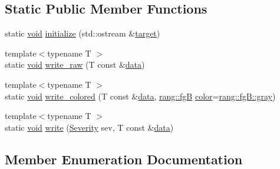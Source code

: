 \subsection*{Static Public Member Functions}
\begin{DoxyCompactItemize}
\item 
static \mbox{\hyperlink{glad_8h_a950fc91edb4504f62f1c577bf4727c29}{void}} \mbox{\hyperlink{class_saturn_1_1_log_system_a9c1ccf4dfe4ab6803134267c8a2b969b}{initialize}} (std\+::ostream \&\mbox{\hyperlink{glad_8h_af9d0cbbbeb7414e786c41899e5a856d7}{target}})
\item 
{\footnotesize template$<$typename T $>$ }\\static \mbox{\hyperlink{glad_8h_a950fc91edb4504f62f1c577bf4727c29}{void}} \mbox{\hyperlink{class_saturn_1_1_log_system_a9d333bbbee49a558628d431b7d4121e9}{write\+\_\+raw}} (T const \&\mbox{\hyperlink{glad_8h_a1848da31b3e095a7152c7cba8375936d}{data}})
\item 
{\footnotesize template$<$typename T $>$ }\\static \mbox{\hyperlink{glad_8h_a950fc91edb4504f62f1c577bf4727c29}{void}} \mbox{\hyperlink{class_saturn_1_1_log_system_a477ee92097499a28744de407fb12c0dd}{write\+\_\+colored}} (T const \&\mbox{\hyperlink{glad_8h_a1848da31b3e095a7152c7cba8375936d}{data}}, \mbox{\hyperlink{namespacerang_a3b83d0d73d49b5a75c3b92031f2c77ee}{rang\+::fgB}} \mbox{\hyperlink{glad_8h_a69995a929d818b8b467d4593c24d98bc}{color}}=\mbox{\hyperlink{namespacerang_a41a68f6ed991b29fa720fcfbcd319ef9acda7a650c5856cf2f6738072447d7825}{rang\+::fg\+B\+::gray}})
\item 
{\footnotesize template$<$typename T $>$ }\\static \mbox{\hyperlink{glad_8h_a950fc91edb4504f62f1c577bf4727c29}{void}} \mbox{\hyperlink{class_saturn_1_1_log_system_a81bd1711a0ed95e64bd345aa7681217e}{write}} (\mbox{\hyperlink{class_saturn_1_1_log_system_ab10c0f79f5466d3e47d56b857d09bdde}{Severity}} sev, T const \&\mbox{\hyperlink{glad_8h_a1848da31b3e095a7152c7cba8375936d}{data}})
\end{DoxyCompactItemize}


\subsection{Member Enumeration Documentation}
\mbox{\label{class_saturn_1_1_log_system_ab10c0f79f5466d3e47d56b857d09bdde}} 
